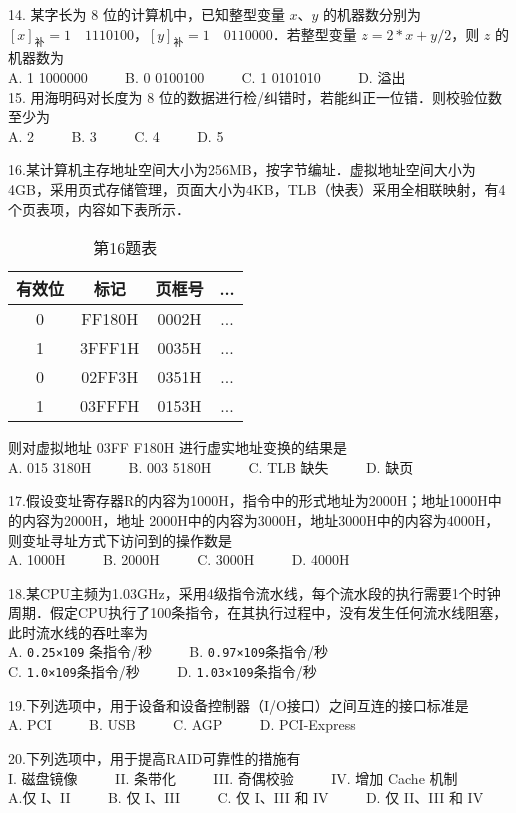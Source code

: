 14.	某字长为 $8$ 位的计算机中，已知整型变量 $x$、$y$ 的机器数分别为 $[x]_\text{补}=1 \quad 1110100$，$[y]_\text{补}=1 \quad 0110000$．若整型变量 $z=2*x+y/2$，则 $z$ 的机器数为 \\
A. 1 1000000 $\qquad$ B. 0 0100100  $\qquad$  C. 1 0101010  $\qquad$  D. 溢出 \\

15.	用海明码对长度为 $8$ 位的数据进行检/纠错时，若能纠正一位错．则校验位数至少为 \\ 
A. 2 $\qquad$ B. 3 $\qquad$ C. 4 $\qquad$ D. 5 

16.某计算机主存地址空间大小为256MB，按字节编址．虚拟地址空间大小为4GB，采用页式存储管理，页面大小为4KB，TLB（快表）采用全相联映射，有4个页表项，内容如下表所示．
\begin{table}[ht]
\centering
\caption{第16题表}\label{CSN13_tab2}
\begin{tabular}{|c|c|c|c|}
\hline
有效位 & 标记 & 页框号 & ... \\
\hline
0 & FF180H & 0002H & ... \\
\hline
1 & 3FFF1H & 0035H & ... \\
\hline
0 & 02FF3H & 0351H & ... \\
\hline
1 & 03FFFH & 0153H & ... \\
\hline
\end{tabular}
\end{table}
则对虚拟地址 03FF F180H 进行虚实地址变换的结果是 \\ 
A. 015 3180H $\qquad$ B. 003 5180H $\qquad$ C. TLB 缺失 $\qquad$ D. 缺页

17.假设变址寄存器R的内容为1000H，指令中的形式地址为2000H；地址1000H中的内容为2000H，地址 2000H中的内容为3000H，地址3000H中的内容为4000H，则变址寻址方式下访问到的操作数是 \\
A. 1000H $\qquad$ B. 2000H $\qquad$ C. 3000H $\qquad$ D. 4000H

18.某CPU主频为1.03GHz，采用4级指令流水线，每个流水段的执行需要1个时钟周期．假定CPU执行了100条指令，在其执行过程中，没有发生任何流水线阻塞，此时流水线的吞吐率为 \\
A. \verb|0.25×109| 条指令/秒 $\qquad$ B. \verb|0.97×109|条指令/秒 \\
C. \verb|1.0×109|条指令/秒  $\qquad$ D. \verb|1.03×109|条指令/秒

19.下列选项中，用于设备和设备控制器（I/O接口）之间互连的接口标准是 \\
A. PCI  $\qquad$  B. USB  $\qquad$ C. AGP  $\qquad$  D. PCI-Express

20.下列选项中，用于提高RAID可靠性的措施有 \\
I. 磁盘镜像 $\qquad$ II. 条带化 $\qquad$ III. 奇偶校验 $\qquad$ IV. 增加 Cache 机制 \\
A.仅 I、II  $\qquad$  B. 仅 I、III  $\qquad$  C. 仅 I、III 和 IV $\qquad$ D. 仅 II、III 和 IV

